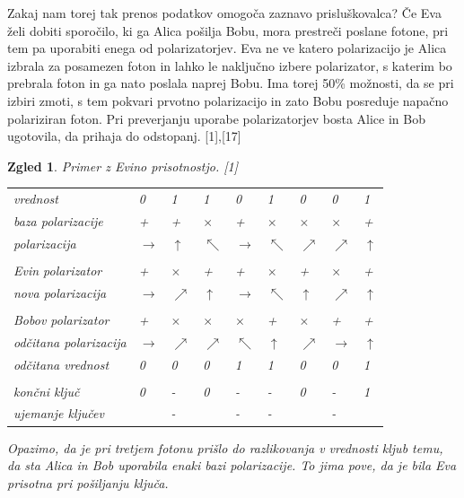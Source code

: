 \documentclass[A4paper, 11pt]{article}
\newtheorem{zgled}{Zgled}
\newcommand{\cmark}{\ding{51}}
\newcommand{\xmark}{\ding{55}}
\begin{document}
Zakaj nam torej tak prenos podatkov omogoča zaznavo prisluškovalca?
Če Eva želi dobiti sporočilo, ki ga Alica pošilja Bobu, mora prestreči poslane fotone, pri tem pa uporabiti enega od polarizatorjev. Eva ne ve katero polarizacijo je Alica izbrala za posamezen foton in lahko le naključno izbere polarizator, s katerim bo prebrala foton in ga nato poslala naprej Bobu. Ima torej 50\% možnosti, da se pri izbiri zmoti, s tem pokvari prvotno polarizacijo in zato Bobu posreduje napačno polariziran foton. Pri preverjanju uporabe polarizatorjev bosta Alice in Bob ugotovila, da prihaja do odstopanj. [1],[17]

\begin{zgled} 
Primer z Evino prisotnostjo. [1]

\begin{center}
\begin{tabular}{ l m{0.3 cm} m{0.3 cm} m{0.3 cm} m{0.3 cm} m{0.3 cm} m{0.3 cm} m{0.3 cm} m{0.3 cm}}
vrednost & 0 & 1 & 1 & 0 & 1 & 0 & 0 & 1\\
baza polarizacije & + & + & $\times$ & + & $\times$ & $\times$ & $\times$ & + \\
polarizacija & $\rightarrow$ & $\uparrow$ & $\nwarrow$ & $\rightarrow$ & $\nwarrow$ & $\nearrow$ & $\nearrow$  & $\uparrow$\\
\\
Evin polarizator & + & $\times$ & + & + & $\times$ & + & $\times$ & +\\
nova polarizacija & $\rightarrow$ & $\nearrow$ & $\uparrow$ & $\rightarrow$ & $\nwarrow$  & $\uparrow$ & $\nearrow$ & $\uparrow$\\
\\
Bobov polarizator & + & $\times$ & $\times$ & $\times$ & + & $\times$ & + & +\\
odčitana polarizacija & $\rightarrow$ & $\nearrow$ & $\nearrow$ & $\nwarrow$ & $\uparrow$  & $\nearrow$ & $\rightarrow$ & $\uparrow$\\
odčitana vrednost & 0 & 0 & 0 & 1 & 1 & 0 & 0 & 1\\
\\
končni ključ & 0 & - & 0 & - & - & 0 & - & 1\\
ujemanje ključev & \cmark & - & \xmark & - & - & \cmark & - & \cmark\\ 
\end{tabular}
\end{center}

Opazimo, da je pri tretjem fotonu prišlo do razlikovanja v vrednosti kljub temu, da sta Alica in Bob uporabila enaki bazi polarizacije. To jima pove, da je bila Eva prisotna pri pošiljanju ključa.

\end{zgled}
\end{document}
